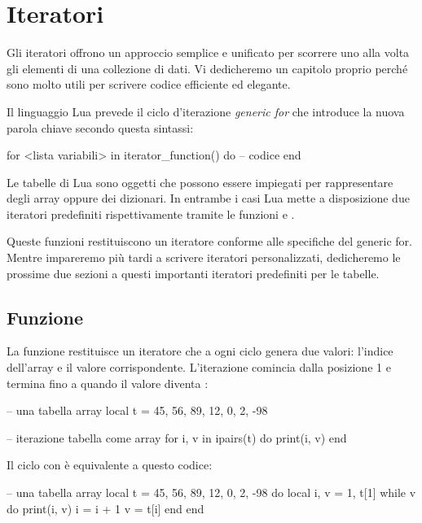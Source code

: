 
\chapter{Iteratori}
\label{iiChIteratori}

Gli iteratori offrono un approccio semplice e unificato per scorrere uno alla
volta gli elementi di una collezione di dati. Vi dedicheremo un capitolo proprio
perché sono molto utili per scrivere codice efficiente ed elegante.

Il linguaggio Lua prevede il ciclo d'iterazione \emph{generic for} che
introduce la nuova parola chiave  secondo questa sintassi:
\begin{lines}
for <lista variabili> in iterator_function() do
-- codice
end
\end{lines}

Le tabelle di Lua sono oggetti che possono essere impiegati per rappresentare
degli array oppure dei dizionari. In entrambe i casi Lua mette a disposizione
due iteratori predefiniti rispettivamente tramite le funzioni
 e .

Queste funzioni restituiscono un iteratore conforme alle specifiche del generic
for. Mentre impareremo più tardi a scrivere iteratori personalizzati,
dedicheremo le prossime due sezioni a questi importanti iteratori predefiniti
per le tabelle.


\section{Funzione }

La funzione  restituisce un iteratore che a ogni ciclo genera due
valori: l'indice dell'array e il valore corrispondente. L'iterazione comincia
dalla posizione 1 e termina fino a quando il valore diventa :
\begin{lines}
-- una tabella array
local t = {45, 56, 89, 12, 0, 2, -98}

-- iterazione tabella come array
for i, v in ipairs(t) do
    print(i, v)
end
\end{lines}

Il ciclo con  è equivalente a questo codice:
\begin{lines}
-- una tabella array
local t = {45, 56, 89, 12, 0, 2, -98}
do
    local i, v = 1, t[1]
    while v do
        print(i, v)
        i = i + 1
        v = t[i]
    end
end
\end{lines}

